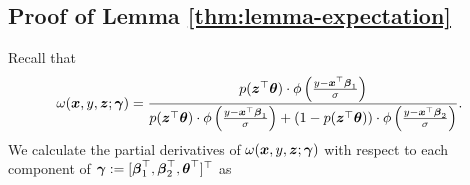 
\subsection{Proof of Lemma \ref{thm:lemma-expectation}} \label{sec:proof-lemma-expectation}

\begin{comment}
This lemma is related to Lemma 2 and Definition 4 (5.5) in \cite{balakrishnan2017statistical}. 
See also (A.5a) on page 37 of the paper. 
Lemma A.1 in \cite{zhang2020estimation}.
\end{comment}
Recall that \begin{equation}
	\omega(\boldsymbol{x}, y, \boldsymbol{z} ; \boldsymbol{\gamma}) 
	= \frac{p(\boldsymbol{z}^\top\boldsymbol{\theta}) \cdot
		\phi\left( \frac{y - \boldsymbol{x}^\top\boldsymbol{\beta}_1}{\sigma} \right)}{p(\boldsymbol{z}^\top\boldsymbol{\theta}) \cdot \phi\left( \frac{y - \boldsymbol{x}^\top\boldsymbol{\beta}_1}{\sigma} \right) 
		+ \left( 1-p(\boldsymbol{z}^\top\boldsymbol{\theta}) \right) \cdot \phi\left( \frac{y - \boldsymbol{x}^\top\boldsymbol{\beta}_2}{\sigma} \right)}.
\end{equation}
We calculate the partial derivatives of $\omega(\boldsymbol{x}, y, \boldsymbol{z} ; \boldsymbol{\gamma})$ with respect to each component of $\boldsymbol{\gamma}:= [\boldsymbol{\beta}_1^\top, \boldsymbol{\beta}_2^\top, \boldsymbol{\theta}^\top]^\top$ as%
